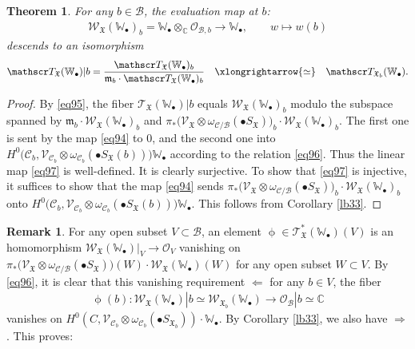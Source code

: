 \documentclass[12pt,b5paper,notitlepage]{report}
\theoremstyle{definition}
\newtheorem{rem}[df]{Remark}
\theoremstyle{plain}
\newtheorem{thm}[df]{Theorem}
\newcommand{\fk}{\mathfrak}
\newcommand{\mc}{\mathcal}
\newcommand{\scr}{\mathscr}
\newcommand{\blt}{\bullet}
\newcommand{\Wbb}{\mathbb W}
\newcommand{\Cbb}{\mathbb C}
\numberwithin{equation}{section}
\begin{document}
\begin{thm}\label{lb69}
For any $b\in\mc B$, the evaluation map at $b$:
\begin{gather}
\scr W_{\fk X}(\Wbb_\blt)_b=\Wbb_\blt\otimes_\Cbb\scr O_{\mc B,b}\rightarrow \Wbb_\blt,\qquad w\mapsto w(b)\label{eq94}
\end{gather}
descends to an isomorphism
\begin{gather}
\scr T_{\fk X}(\Wbb_\blt)|b=\frac{\scr T_{\fk X}(\Wbb_\blt)_b}{\fk m_b\cdot \scr T_{\fk X}(\Wbb_\blt)_b}\quad\xlongrightarrow{\simeq} \quad\scr T_{\fk X_b}(\Wbb_\blt).\label{eq97}
\end{gather}
\end{thm}

\begin{proof}
By \eqref{eq95}, the fiber $\scr T_{\fk X}(\Wbb_\blt)|b$ equals $\scr W_{\fk X}(\Wbb_\blt)_b$ modulo the subspace spanned by $\fk m_b\cdot\scr W_{\fk X}(\Wbb_\blt)_b$ and $\pi_*\big(\scr V_{\fk X}\otimes\omega_{\mc C/\mc B}(\blt S_{\fk X})\big)_b\cdot \scr W_{\fk X}(\Wbb_\blt)_b$. The first one is sent by the map \eqref{eq94} to $0$, and the second one into $H^0\big(\mc C_b,\scr V_{\mc C_b}\otimes\omega_{\mc C_b}(\blt S_{\fk X}(b))\big) \Wbb_\blt$ according to the relation \eqref{eq96}. Thus the linear map \eqref{eq97} is well-defined. It is clearly surjective. To show that \eqref{eq97} is injective, it suffices to show that the map  \eqref{eq94} sends $\pi_*\big(\scr V_{\fk X}\otimes\omega_{\mc C/\mc B}(\blt S_{\fk X})\big)_b\cdot \scr W_{\fk X}(\Wbb_\blt)_b$ onto $H^0\big(\mc C_b,\scr V_{\mc C_b}\otimes\omega_{\mc C_b}(\blt S_{\fk X}(b))\big) \Wbb_\blt$. This follows from Corollary \ref{lb33}.
\end{proof}

\begin{rem}
For any open subset $V\subset\mc B$, an element $\upphi\in\scr T_{\fk X}^*(\Wbb_\blt)(V)$ is an homomorphism $\scr W_{\fk X}(\Wbb_\blt)|_V\rightarrow\scr O_V$ vanishing on $\pi_*\big(\scr V_{\fk X}\otimes\omega_{\mc C/\mc B}(\blt S_{\fk X})\big)(W)\cdot \scr W_{\fk X}(\Wbb_\blt)(W)$ for any open subset $W\subset V$. By \eqref{eq96}, it is clear that this vanishing requirement $\Leftarrow$ for any $b\in V$, the fiber
\begin{align*}
\upphi(b):\scr W_{\fk X}(\Wbb_\blt)|b\simeq\scr W_{\fk X_b}(\Wbb_\blt)\rightarrow \scr O_{\mc B}|b\simeq \Cbb
\end{align*}
vanishes on $H^0(C,\scr V_{\mc C_b}\otimes\omega_{\mc C_b}(\blt S_{\fk X_b}))\cdot\Wbb_\blt$. By Corollary \ref{lb33}, we also have $\Rightarrow$. This proves:
\end{rem}
\end{document}
